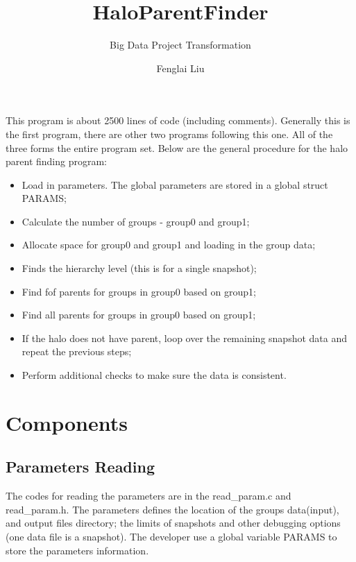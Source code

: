 \documentclass[notheorems, aspectratio=54]{beamer}
\title[Halo Parent Finder]{HaloParentFinder}
\subtitle{Big Data Project Transformation}
\author{Fenglai Liu}
\institute[ACCRE]{fenglai@accre.vanderbilt.edu}
\begin{document}
\begin{frame}
    \titlepage
\end{frame}


\begin{frame}

This program is about 2500 lines of code (including comments). Generally this is the first program, there are other two programs
following this one. All of the three forms the entire program set. Below are the general procedure for the halo parent finding program:
\begin{itemize}
 \item Load in parameters. The global parameters are stored in a global struct PARAMS;
 \item Calculate the number of groups - group0 and group1;
 \item Allocate space for group0 and group1 and loading in the group data; 
 \item Finds the hierarchy level (this is for a single snapshot);
 \item Find fof parents for groups in group0 based on group1;
 \item Find all parents for groups in group0 based on group1;
 \item If the halo does not have parent, loop over the remaining snapshot data and repeat the previous steps;
 \item Perform additional checks to make sure the data is consistent.
\end{itemize}


\end{frame}

\section{Components}

\subsection{Parameters Reading}
\begin{frame}

The codes for reading the parameters are in the read\_param.c and read\_param.h. The parameters defines
the location of the groups data(input), and output files directory; the limits of snapshots 
and other debugging options (one data file is a snapshot). The developer use a global variable PARAMS to store 
the parameters information. 

\end{frame}
\end{document}
